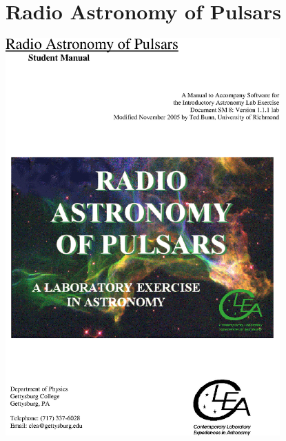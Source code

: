 \chapter{Radio Astronomy of Pulsars}

\hskip0.2in\includegraphics[height=6in]{wordtops/pulsar1.eps}

